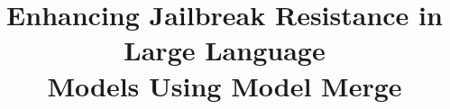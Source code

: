 \documentclass[conference,compsoc]{IEEEtran}
\begin{document}
%
\title{Enhancing Jailbreak Resistance in Large Language \\Models Using Model Merge}







% 
\author{ 

}

\end{document}
